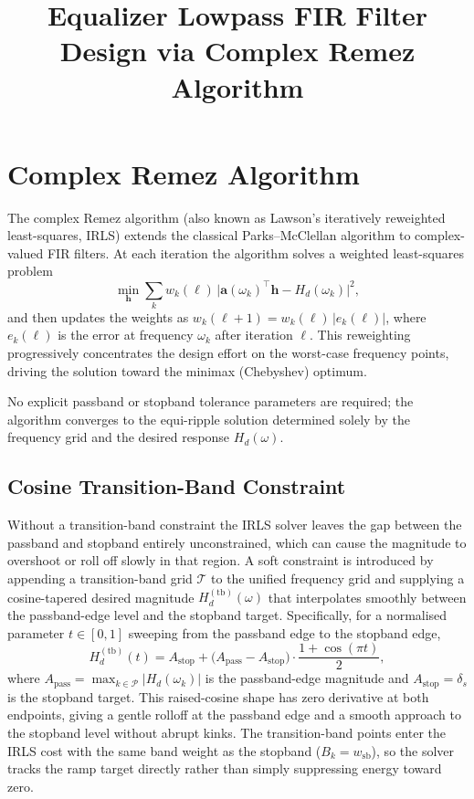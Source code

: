\documentclass[11pt, a4paper]{article}
\title{Equalizer Lowpass FIR Filter Design via Complex Remez Algorithm}
\author{}
\date{}
\begin{document}
\maketitle

\section{Complex Remez Algorithm}

The complex Remez algorithm (also known as Lawson's iteratively reweighted
least-squares, IRLS) extends the classical Parks--McClellan algorithm to
complex-valued FIR filters.  At each iteration the algorithm solves a
weighted least-squares problem
\[
  \min_{\mathbf{h}} \sum_k w_k(\ell)\,
    \bigl\lvert \mathbf{a}(\omega_k)^\top \mathbf{h} - H_d(\omega_k) \bigr\rvert^2,
\]
and then updates the weights as
$w_k(\ell+1) = w_k(\ell)\,\lvert e_k(\ell) \rvert$,
where $e_k(\ell)$ is the error at frequency $\omega_k$ after iteration
$\ell$.  This reweighting progressively concentrates the design effort on
the worst-case frequency points, driving the solution toward the
minimax (Chebyshev) optimum.

No explicit passband or stopband tolerance parameters are required; the
algorithm converges to the equi-ripple solution determined solely by the
frequency grid and the desired response $H_d(\omega)$.

\subsection{Cosine Transition-Band Constraint}

Without a transition-band constraint the IRLS solver leaves the gap between
the passband and stopband entirely unconstrained, which can cause the
magnitude to overshoot or roll off slowly in that region.  A soft constraint
is introduced by appending a transition-band grid $\mathcal{T}$ to the
unified frequency grid and supplying a cosine-tapered desired magnitude
$H_d^{(\mathrm{tb})}(\omega)$ that interpolates smoothly between the
passband-edge level and the stopband target.  Specifically, for a
normalised parameter $t \in [0, 1]$ sweeping from the passband edge to the
stopband edge,
\[
  H_d^{(\mathrm{tb})}(t)
  = A_{\mathrm{stop}}
    + \bigl(A_{\mathrm{pass}} - A_{\mathrm{stop}}\bigr)
      \cdot \frac{1 + \cos(\pi t)}{2},
\]
where $A_{\mathrm{pass}} = \max_{k\in\mathcal{P}}|H_d(\omega_k)|$ is the
passband-edge magnitude and $A_{\mathrm{stop}} = \delta_s$ is the stopband
target.  This raised-cosine shape has zero derivative at both endpoints,
giving a gentle rolloff at the passband edge and a smooth approach to the
stopband level without abrupt kinks.  The transition-band points enter the
IRLS cost with the same band weight as the stopband ($B_k = w_{\mathrm{sb}}$),
so the solver tracks the ramp target directly rather than simply suppressing
energy toward zero.
\end{document}
